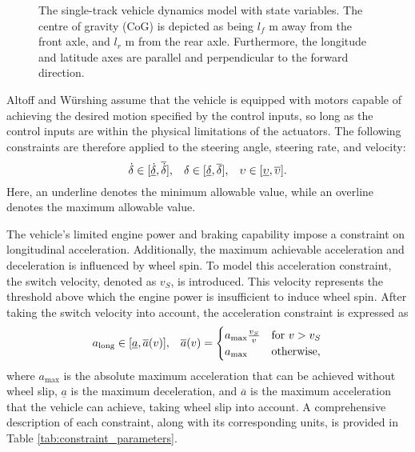 

\begin{figure}[htb!]
    \centering
    
    \caption[The single tack vehicle dynamics model]{The single-track vehicle dynamics model with state variables. The centre of gravity (CoG) is depicted as being $l_f$ m away from the front axle, and $l_r$ m from the rear axle. Furthermore, the longitude and latitude axes are parallel and perpendicular to the forward direction.}
    \label{fig:vehicle_dynamics_model}
\end{figure}


Altoff and  W\"{u}rshing \cite{Althoff2020} assume that the vehicle is equipped with motors capable of achieving the desired motion specified by the control inputs, so long as the control inputs are within the physical limitations of the actuators.
The following constraints are therefore applied to the steering angle, steering rate, and velocity:
\begin{equation}
\dot{\delta} \in [\underline{\dot{\delta}}, \overline{\dot{\delta}}], \hspace{0.3cm} 
\delta \in [\underline{\delta}, \overline{\delta}], \hspace{0.3cm} 
\upsilon \in [\underline{\upsilon}, \overline{\upsilon}].
\label{eq:control_constraints}
\end{equation}
Here, an underline denotes the minimum allowable value, while an overline denotes the maximum allowable value.

The vehicle's limited engine power and braking capability impose a constraint on longitudinal acceleration. 
Additionally, the maximum achievable acceleration and deceleration is influenced by wheel spin. 
To model this acceleration constraint, the switch velocity, denoted as $v_S$, is introduced. 
This velocity represents the threshold above which the engine power is insufficient to induce wheel spin. 
After taking the switch velocity into account, the acceleration constraint is expressed as
\begin{equation}
    a_{\text{long}} \in [\underline{a}, \overline{a}(v)], \hspace{0.3cm} 
    \overline{a}(v) = 
    \begin{cases}
        a_{\text{max}} \frac{v_{S}}{v} & \text{for } v > v_{S} \\
        a_{\text{max}} & \text{otherwise},
    \end{cases}
\label{eq:accl_constraint}
\end{equation}
where $a_{\text{max}}$ is the absolute maximum acceleration that can be achieved without wheel slip, $\underline{a}$ is the maximum deceleration, and $\overline{a}$ is the maximum acceleration that the vehicle can achieve, taking wheel slip into account.
A comprehensive description of each constraint, along with its corresponding units, is provided in Table \ref{tab:constraint_parameters}.


